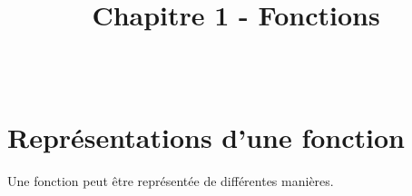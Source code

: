 \documentclass[paper=a4, fontsize=9pt]{scrartcl} %
\title{	
  \vspace{-10ex}
  \horrule{0.5pt} \\[0.4cm] %
  \huge Chapitre 1 - Fonctions\\ %
  \horrule{2pt} \\[0.5cm] %
}
\author{}
\date{\vspace{-10ex}} %
\begin{document}

\newtheorem{Definition}{Définition}
\newtheorem{Theorem}{Théorème}
\newtheorem{Proposition}{Propriété}

\renewcommand{\labelitemi}{$\bullet$}
\renewcommand{\labelitemii}{$\circ$}

\maketitle %

\section{Représentations d'une fonction}
Une fonction peut être représentée de différentes manières.
\end{document}
